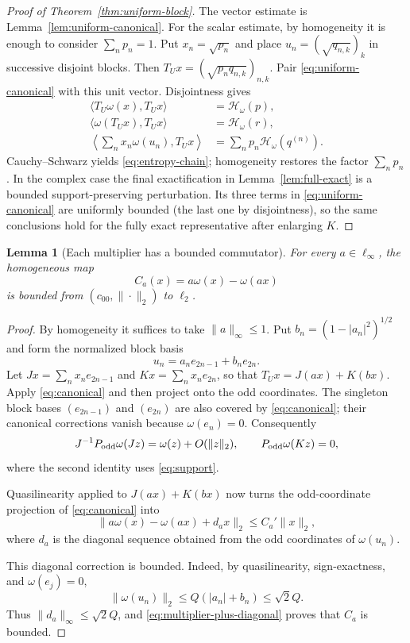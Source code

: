 \documentclass[11pt]{article}
\newtheorem{lemma}[theorem]{Lemma}
\newcommand{\czz}{c_{00}}
\begin{document}
\begin{proof}[Proof of Theorem~\ref{thm:uniform-block}]
The vector estimate is Lemma~\ref{lem:uniform-canonical}.  For the scalar
estimate, by homogeneity it is enough to consider $\sum_np_n=1$.  Put
$x_n=\sqrt{p_n}$ and place $u_n=(\sqrt{q_{n,k}})_k$ in successive disjoint
blocks.  Then $T_Ux=(\sqrt{p_nq_{n,k}})_{n,k}$.  Pair
\eqref{eq:uniform-canonical} with this unit vector.  Disjointness gives
\begin{align*}
 \langle T_U\omega(x),T_Ux\rangle
   &=\mathcal H_\omega(p),\\
 \langle\omega(T_Ux),T_Ux\rangle
   &=\mathcal H_\omega(r),\\
 \left\langle\sum_nx_n\omega(u_n),T_Ux\right\rangle
   &=\sum_np_n\mathcal H_\omega(q^{(n)}).
\end{align*}
Cauchy--Schwarz yields \eqref{eq:entropy-chain}; homogeneity restores the
factor $\sum_np_n$.  In the complex case the final exactification in
Lemma~\ref{lem:full-exact} is a bounded support-preserving perturbation.
Its three terms in \eqref{eq:uniform-canonical} are uniformly bounded (the
last one by disjointness), so the same conclusions hold for the fully exact
representative after enlarging $K$.
\end{proof}

\begin{lemma}[Each multiplier has a bounded commutator]\label{lem:pointwise}
For every $a\in\ell_\infty$, the homogeneous map
\[
 C_a(x)=a\omega(x)-\omega(ax)
\]
is bounded from $(\czz,\|\cdot\|_2)$ to $\ell_2$.
\end{lemma}

\begin{proof}
By homogeneity it suffices to take $\|a\|_\infty\le1$.  Put
$b_n=(1-|a_n|^2)^{1/2}$ and form the normalized block basis
\[
 u_n=a_ne_{2n-1}+b_ne_{2n}.
\]
Let $Jx=\sum_nx_ne_{2n-1}$ and $Kx=\sum_nx_ne_{2n}$, so that
$T_Ux=J(ax)+K(bx)$.  Apply \eqref{eq:canonical} and then project onto the
odd coordinates.  The singleton block bases $(e_{2n-1})$ and $(e_{2n})$
are also covered by \eqref{eq:canonical}; their canonical corrections
vanish because $\omega(e_n)=0$.  Consequently
\[
 J^{-1}P_{\rm odd}\omega(Jz)=\omega(z)+O(\|z\|_2),
 \qquad P_{\rm odd}\omega(Kz)=0,
\]
where the second identity uses \eqref{eq:support}.

Quasilinearity applied to $J(ax)+K(bx)$ now turns the odd-coordinate
projection of \eqref{eq:canonical} into
\begin{equation}\label{eq:multiplier-plus-diagonal}
 \|a\omega(x)-\omega(ax)+d_ax\|_2\le C_a'\|x\|_2,
\end{equation}
where $d_a$ is the diagonal sequence obtained from the odd coordinates of
$\omega(u_n)$.

This diagonal correction is bounded.  Indeed, by quasilinearity,
sign-exactness, and $\omega(e_j)=0$,
\[
 \|\omega(u_n)\|_2
 \le Q(|a_n|+b_n)\le\sqrt2Q.
\]
Thus $\|d_a\|_\infty\le\sqrt2Q$, and
\eqref{eq:multiplier-plus-diagonal} proves that $C_a$ is bounded.
\end{proof}
\end{document}
